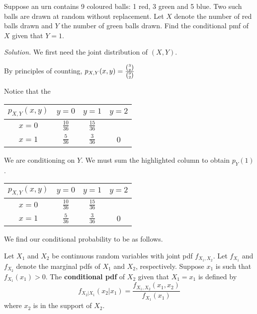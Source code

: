 \begin{example}[]
	Suppose an urn contains 9 coloured balls: {\color{red}1 red}, {\color{green}3 green} and {\color{blue}5 blue}. Two such balls are drawn at random without replacement. Let {\color{red}$X$} denote the number of red balls drawn and {\color{green}$Y$} the number of green balls drawn. Find the conditional pmf of $X$ given that $Y=1$.

	\textit{Solution.} We first need the joint distribution of $(X,Y)$.

	By principles of counting, $p_{X,Y}(x,y)=\frac{\ncr{3}{y}}{\ncr{9}{2}}$

	Notice that the 
	\begin{center}
	\begin{tabular}{c | c c c}
		$p_{X,Y}(x,y)$ & $y=0$ & $y=1$ & $y=2$\\ \hline
		{\color{red}$x=0$} & $\frac{10}{36}$ & $\frac{15}{36}$\\
		{\color{red}$x=1$} & $\frac 5{36}$ & $\frac 3{36}$ & 0
	\end{tabular}
	\end{center}

	We are conditioning on $Y$. We must sum the highlighted column to obtain $p_Y(1)$.
	\begin{center}
	\begin{tabular}{c | c c c}
		$p_{X,Y}(x,y)$ & $y=0$ & $y=1$ & $y=2$\\ \hline
		$x=0$ & $\frac{10}{36}$ & $\frac{15}{36}$\\
		$x=1$ & $\frac 5{36}$ & $\frac 3{36}$ & 0
	\end{tabular}
	\end{center}

	We find our conditional probability to be as follows.

\end{example}



\begin{definition}
	Let $X_1$ and $X_2$ be continuous random variables with joint pdf $f_{X_1,X_2}$. Let $f_{X_1}$ and $f_{X_2}$ denote the marginal pdfs of $X_1$ and $X_2$, respectively. Suppose $x_1$ is such that $f_{X_1}(x_1)>0$. The \textbf{conditional pdf} of $X_2$ given that $X_1=x_1$ is defined by
	$$f_{X_2|X_1}(x_2|x_1)=\frac{f_{X_1,X_2}(x_1,x_2)}{f_{X_1}(x_1)}$$
	where $x_2$ is in the support of $X_2$.
\end{definition}

